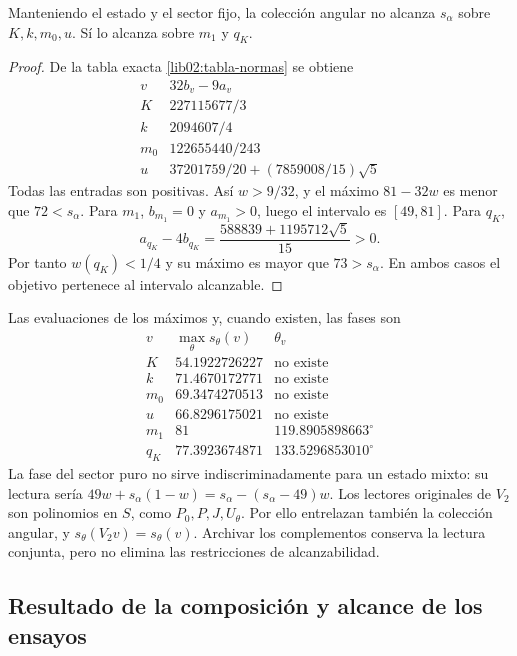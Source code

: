 \begin{corollary}
\label{lib02:seis-angulares}
Manteniendo el estado y el sector fijo, la colección angular no alcanza
\(s_\alpha\) sobre \(K,k,m_0,u\). Sí lo alcanza sobre
\(m_1\) y \(q_K\).
\end{corollary}
\begin{proof}
De la tabla exacta \eqref{lib02:tabla-normas} se obtiene
\[
\begin{array}{c|c}
 v&32b_v-9a_v\\\hline
 K&227115677/3\\
 k&2094607/4\\
 m_0&122655440/243\\
 u&37201759/20+(7859008/15)\sqrt5
\end{array}
\]
Todas las entradas son positivas. Así \(w>9/32\), y el máximo
\(81-32w\) es menor que \(72<s_\alpha\). Para \(m_1\),
\(b_{m_1}=0\) y \(a_{m_1}>0\), luego el intervalo es
\([49,81]\). Para \(q_K\),
\[
 a_{q_K}-4b_{q_K}=\frac{588839+1195712\sqrt5}{15}>0.
\]
Por tanto \(w(q_K)<1/4\) y su máximo es mayor que
\(73>s_\alpha\). En ambos casos el objetivo pertenece al
intervalo alcanzable.
\end{proof}

Las evaluaciones de los máximos y, cuando existen, las fases son
\[
\begin{array}{c|c|c}
 v&\max_\theta s_\theta(v)&\theta_v\\\hline
 K&54.1922726227&\text{no existe}\\
 k&71.4670172771&\text{no existe}\\
 m_0&69.3474270513&\text{no existe}\\
 u&66.8296175021&\text{no existe}\\
 m_1&81&119.8905898663^\circ\\
 q_K&77.3923674871&133.5296853010^\circ
\end{array}
\]
La fase del sector puro no sirve indiscriminadamente para un estado
mixto: su lectura sería
\(49w+s_\alpha(1-w)=s_\alpha-(s_\alpha-49)w\).
Los lectores originales de \(V_2\) son polinomios en \(S\), como
\(P_0,P,J,U_\theta\). Por ello entrelazan también la colección
angular, y \(s_\theta(V_2v)=s_\theta(v)\). Archivar los
complementos conserva la lectura conjunta, pero no elimina las
restricciones de alcanzabilidad.

\subsection{Resultado de la composición y alcance de los ensayos}
\label{lib02:alcance}

